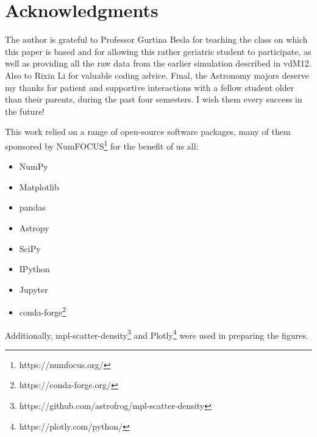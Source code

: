 \documentclass[twocolumn]{aastex63}
\newcommand{\todo}{\color{red}{TODO}\color{black}\hspace{2mm}}
\begin{document}
\todo{\textbf{\textit{add some!}}}
\vspace{30mm}


\section{Acknowledgments}

The author is grateful to Professor Gurtina Besla for teaching the class on which this paper is based and for allowing this rather geriatric student to participate, as well as providing all the raw data from the earlier simulation described in vdM12. Also to Rixin Li for valuable coding advice. Final, the Astronomy majors deserve my thanks for patient and supportive interactions with a fellow student older than their parents, during the past four semesters. I wish them every success in the future!

This work relied on a range of open-source software packages, many of them sponsored by NumFOCUS\footnote{https://numfocus.org/} for the benefit of us all: 

\begin{itemize}
  \setlength\itemsep{-1mm}
	\item NumPy \citep{van_der_walt_numpy_2011}
	\item Matplotlib \citep{hunter_matplotlib_2007}
	\item pandas \citep{mckinney-proc-scipy-2010}
	\item Astropy \citep{astropy:2013}
	\item SciPy \citep{2020SciPy-NMeth}
	\item IPython \citep{perez_ipython_2007}
	\item Jupyter \citep{Kluyver:2016aa}
	\item conda-forge\footnote{https://conda-forge.org/}
\end{itemize}

 Additionally, mpl-scatter-density\footnote{https://github.com/astrofrog/mpl-scatter-density} and Plotly\footnote{https://plotly.com/python/} were used in preparing the figures.


{}

\end{document}
